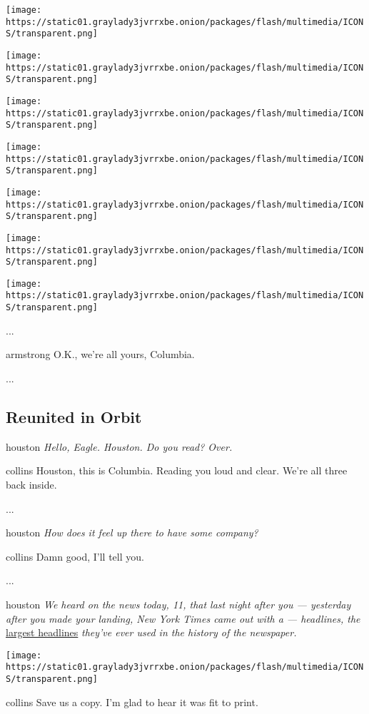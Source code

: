 \texttt{[image: https://static01.graylady3jvrrxbe.onion/packages/flash/multimedia/ICONS/transparent.png]}

\texttt{[image: https://static01.graylady3jvrrxbe.onion/packages/flash/multimedia/ICONS/transparent.png]}

\texttt{[image: https://static01.graylady3jvrrxbe.onion/packages/flash/multimedia/ICONS/transparent.png]}

\texttt{[image: https://static01.graylady3jvrrxbe.onion/packages/flash/multimedia/ICONS/transparent.png]}

\texttt{[image: https://static01.graylady3jvrrxbe.onion/packages/flash/multimedia/ICONS/transparent.png]}

\texttt{[image: https://static01.graylady3jvrrxbe.onion/packages/flash/multimedia/ICONS/transparent.png]}

\texttt{[image: https://static01.graylady3jvrrxbe.onion/packages/flash/multimedia/ICONS/transparent.png]}

...

armstrong O.K., we're all yours, Columbia.

...

\hypertarget{-reunited-in-orbit-}{%
\subsection{ Reunited in Orbit }\label{-reunited-in-orbit-}}

houston \emph{Hello, Eagle. Houston. Do you read? Over.}

collins Houston, this is Columbia. Reading you loud and clear. We're all
three back inside.

...

houston \emph{How does it feel up there to have some company?}

collins Damn good, I'll tell you.

...

houston \emph{We heard on the news today, 11, that last night after you
--- yesterday after you made your landing, New York Times came out with
a --- headlines, the}
\href{https://www.nytimes3xbfgragh.onion/2019/07/18/science/apollo-11-john-noble-wilford.html}{largest
headlines} \emph{they've ever used in the history of the newspaper.}

\texttt{[image: https://static01.graylady3jvrrxbe.onion/packages/flash/multimedia/ICONS/transparent.png]}

collins Save us a copy. I'm glad to hear it was fit to print.

